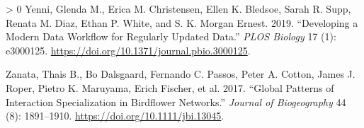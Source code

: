 \documentclass[11pt]{article}
\newlength{\cslhangindent}
\newenvironment{CSLReferences}[3] %
 {%
  \setlength{\parindent}{0pt}
  \ifodd #1 \everypar{\setlength{\hangindent}{\cslhangindent}}\ignorespaces\fi
  \ifnum #2 > 0
  \setlength{\parskip}{#2\baselineskip}
  \fi
 }%
 {}
\begin{document}
\begin{CSLReferences}{1}{0}
\leavevmode\hypertarget{ref-Yenni2019DevMod}{}%
Yenni, Glenda M., Erica M. Christensen, Ellen K. Bledsoe, Sarah R. Supp,
Renata M. Diaz, Ethan P. White, and S. K. Morgan Ernest. 2019.
{``Developing a Modern Data Workflow for Regularly Updated Data.''}
\emph{PLOS Biology} 17 (1): e3000125.
\url{https://doi.org/10.1371/journal.pbio.3000125}.

\leavevmode\hypertarget{ref-Zanata2017GloPat}{}%
Zanata, Thais B., Bo Dalsgaard, Fernando C. Passos, Peter A. Cotton,
James J. Roper, Pietro K. Maruyama, Erich Fischer, et al. 2017.
{``Global Patterns of Interaction Specialization in Birdflower
Networks.''} \emph{Journal of Biogeography} 44 (8): 1891--1910.
\url{https://doi.org/10.1111/jbi.13045}.

\end{CSLReferences}
\end{document}
